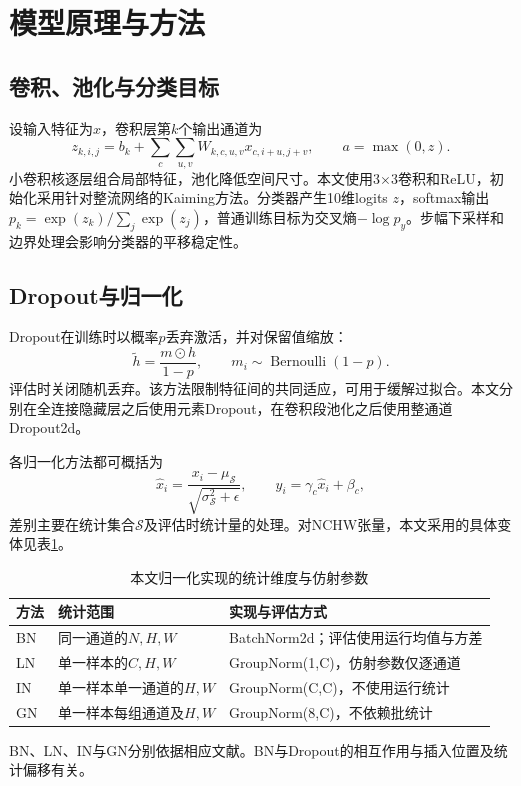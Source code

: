 \section{模型原理与方法}
\subsection{卷积、池化与分类目标}
设输入特征为$x$，卷积层第$k$个输出通道为
\begin{equation}
 z_{k,i,j}=b_k+\sum_c\sum_{u,v}W_{k,c,u,v}x_{c,i+u,j+v},\qquad a=\max(0,z).
\end{equation}
小卷积核逐层组合局部特征，池化降低空间尺寸。本文使用3$\times$3卷积和ReLU，初始化采用针对整流网络的Kaiming方法\cite{he2015rectifiers}。分类器产生10维logits $z$，softmax输出$p_k=\exp(z_k)/\sum_j\exp(z_j)$，普通训练目标为交叉熵$-\log p_y$。步幅下采样和边界处理会影响分类器的平移稳定性。

\subsection{Dropout与归一化}
Dropout在训练时以概率$p$丢弃激活，并对保留值缩放：
\begin{equation}
 \widetilde h=\frac{m\odot h}{1-p},\qquad m_i\sim\operatorname{Bernoulli}(1-p).
\end{equation}
评估时关闭随机丢弃。该方法限制特征间的共同适应，可用于缓解过拟合\cite{srivastava2014dropout}。本文分别在全连接隐藏层之后使用元素Dropout，在卷积段池化之后使用整通道Dropout2d。

各归一化方法都可概括为
\begin{equation}
 \widehat x_i=\frac{x_i-\mu_{\mathcal S}}{\sqrt{\sigma^2_{\mathcal S}+\epsilon}},\qquad
 y_i=\gamma_c\widehat x_i+\beta_c,
\end{equation}
差别主要在统计集合$\mathcal S$及评估时统计量的处理。对NCHW张量，本文采用的具体变体见表\ref{tab:normdef}。
\begin{table}[htbp]\centering\small
\caption{本文归一化实现的统计维度与仿射参数}\label{tab:normdef}
\begin{tabularx}{\linewidth}{llX}
\toprule 方法 & 统计范围 & 实现与评估方式\\\midrule
BN & 同一通道的$N,H,W$ & BatchNorm2d；评估使用运行均值与方差\\
LN & 单一样本的$C,H,W$ & GroupNorm(1,C)，仿射参数仅逐通道\\
IN & 单一样本单一通道的$H,W$ & GroupNorm(C,C)，不使用运行统计\\
GN & 单一样本每组通道及$H,W$ & GroupNorm(8,C)，不依赖批统计\\
\bottomrule\end{tabularx}\end{table}
\FloatBarrier
BN、LN、IN与GN分别依据相应文献\cite{ioffe2015batchnorm,ba2016layernorm,ulyanov2016instancenorm,wu2018groupnorm}。BN与Dropout的相互作用与插入位置及统计偏移有关\cite{li2019disharmony}。

